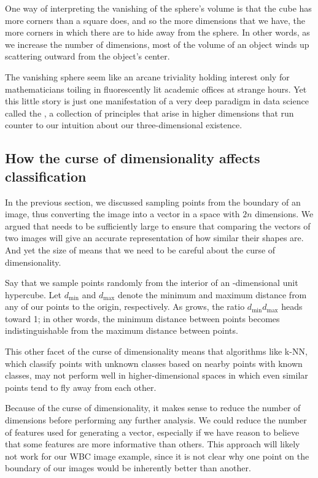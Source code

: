 One way of interpreting the vanishing of the sphere's volume is that the cube has more corners than a square does, and so the more dimensions that we have, the more corners in which there are to hide away from the sphere. In other words, as we increase the number of dimensions, most of the volume of an object winds up scattering outward from the object's center.

The vanishing sphere seem like an arcane triviality holding interest only for mathematicians toiling in fluorescently lit academic offices at strange hours. Yet this little story is just one manifestation of a very deep paradigm in data science called the , a collection of principles that arise in higher dimensions that run counter to our intuition about our three-dimensional existence.

\FloatBarrier
{}
\subsection{How the curse of dimensionality affects classification}

In the previous section, we discussed sampling  points from the boundary of an image, thus converting the image into a vector in a space with $2n$ dimensions. We argued that  needs to be sufficiently large to ensure that comparing the vectors of two images will give an accurate representation of how similar their shapes are. And yet the size of  means that we need to be careful about the curse of dimensionality.

Say that we sample  points randomly from the interior of an -dimensional unit hypercube. Let $d_{\text{min}}$ and $d_{\text{max}}$ denote the minimum and maximum distance from any of our points to the origin, respectively. As  grows, the ratio $d_{\text{min}}d_{\text{max}}$ heads toward 1; in other words, the minimum distance between points becomes indistinguishable from the maximum distance between points.

This other facet of the curse of dimensionality means that algorithms like k-NN, which classify points with unknown classes based on nearby points with known classes, may not perform well in higher-dimensional spaces in which even similar points tend to fly away from each other.

Because of the curse of dimensionality, it makes sense to reduce the number of dimensions before performing any further analysis. We could reduce the number of features used for generating a vector, especially if we have reason to believe that some features are more informative than others. This approach will likely not work for our WBC image example, since it is not clear why one point on the boundary of our images would be inherently better than another.

